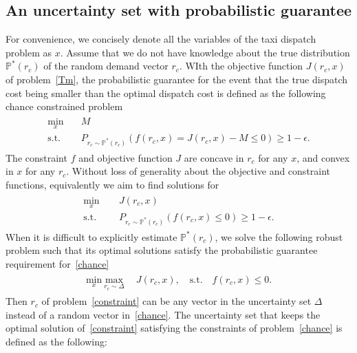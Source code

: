 \documentclass[10pt,twocolumn,twoside,english]{IEEEtran}
\begin{document}
\subsection{An uncertainty set with probabilistic guarantee}
For convenience, we concisely denote all the variables of the taxi dispatch problem as $x$. Assume that we do not have knowledge about the true distribution $\mathbb{P}^*(r_c)$ of the random demand vector $r_c$. WIth the objective function $J(r_c, x)$ of problem~\eqref{Tm}, the probabilistic guarantee for the event that the true dispatch cost being smaller than the optimal dispatch cost is defined as the following chance constrained problem
\begin{align}
\begin{split}
\underset{x}{\text{min}} \quad &M\\
\text{s.t.}\quad & P_{r_c \sim \mathbb{P}^*(r_c)} (f(r_c,x) = J(r_c,x)-M \leqslant 0)\geqslant 1-\epsilon.
\end{split}
\label{obj_2}
\end{align}
The constraint $f$ and objective function $J$ are concave in $r_c$ for any $x$, and convex in $x$ for any $r_c$. Without loss of generality about the objective and constraint functions, equivalently we aim to find solutions for\begin{align}
\begin{split}
\underset{x}{\text{min}}\ \quad &J(r_c, x)\\
\text{s.t.}\quad & P_{r_c \sim \mathbb{P}^*(r_c)}(f(r_c,x) \leqslant 0) \geqslant 1-\epsilon.
\end{split}
\label{chance}
\end{align}
When it is difficult to explicitly estimate $\mathbb{P}^*(r_c)$, we solve the following robust problem such that its optimal solutions satisfy the probabilistic guarantee requirement for~\eqref{chance}\begin{align}
\begin{split}
\underset{x}{\text{min}}\ \underset{r_c \sim \Delta}{\text{max}} \ \quad J (r_c, x),\quad 
\text{s.t.}\quad f(r_c, x) \leqslant 0.\end{split}
\label{constraint}
\end{align}
Then $r_c$ of problem~\eqref{constraint} can be any vector in the uncertainty set $\Delta$ instead of a random vector in~\eqref{chance}. The uncertainty set that keeps the optimal solution of~\eqref{constraint} satisfying the constraints of problem~\eqref{chance} is defined as the following:
\end{document}
